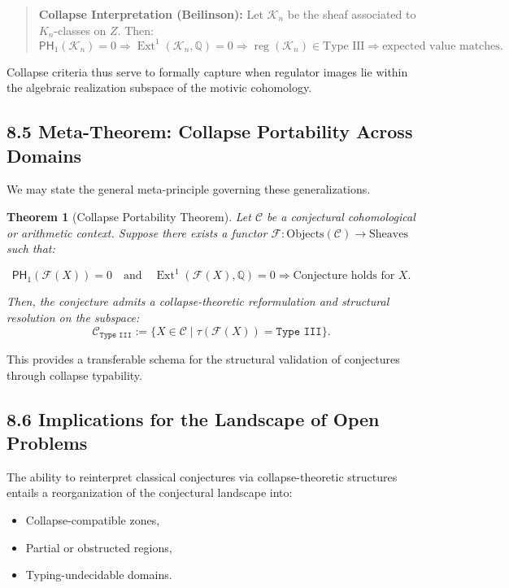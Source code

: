 \documentclass[11pt]{article}
\newtheorem{theorem}{Theorem}[section]
\DeclareMathOperator{\Ext}{Ext}
\begin{document}
\begin{quote}
\textbf{Collapse Interpretation (Beilinson):}  
Let $\mathcal{K}_n$ be the sheaf associated to $K_n$-classes on $Z$. Then:
\[
\mathsf{PH}_1(\mathcal{K}_n) = 0 \Rightarrow \Ext^1(\mathcal{K}_n, \mathbb{Q}) = 0
\Rightarrow \operatorname{reg}(\mathcal{K}_n) \in \text{Type III} \Rightarrow \text{expected value matches}.
\]
\end{quote}

Collapse criteria thus serve to formally capture when regulator images lie within the algebraic realization subspace of the motivic cohomology.

\subsection{8.5 Meta-Theorem: Collapse Portability Across Domains}

We may state the general meta-principle governing these generalizations.

\begin{theorem}[Collapse Portability Theorem]
Let $\mathcal{C}$ be a conjectural cohomological or arithmetic context. Suppose there exists a functor $\mathcal{F}: \text{Objects}(\mathcal{C}) \to \text{Sheaves}$ such that:

\[
\mathsf{PH}_1(\mathcal{F}(X)) = 0 \quad \text{and} \quad \Ext^1(\mathcal{F}(X), \mathbb{Q}) = 0
\Rightarrow \text{Conjecture holds for } X.
\]

Then, the conjecture admits a collapse-theoretic reformulation and structural resolution on the subspace:
\[
\mathcal{C}_{\texttt{Type III}} := \{ X \in \mathcal{C} \mid \tau(\mathcal{F}(X)) = \texttt{Type III} \}.
\]
\end{theorem}

This provides a transferable schema for the structural validation of conjectures through collapse typability.

\subsection{8.6 Implications for the Landscape of Open Problems}

The ability to reinterpret classical conjectures via collapse-theoretic structures entails a reorganization of the conjectural landscape into:

\begin{itemize}
  \item Collapse-compatible zones,
  \item Partial or obstructed regions,
  \item Typing-undecidable domains.
\end{itemize}
\end{document}
